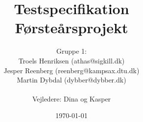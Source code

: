 \documentclass[a4paper,oneside,article]{memoir}
\title{Testspecifikation  \\ \small{Førsteårsprojekt}}
\author
{
  Gruppe 1:\\
  Troels Henriksen (athas@sigkill.dk)\\
  Jesper Reenberg (reenberg@kampsax.dtu.dk)\\
  Martin Dybdal (dybber@dybber.dk)\\ \\
  Vejledere: Dina og Kasper
}
\date{\today}
\begin{document}
\maketitle
\newpage
\tableofcontents*
\newpage

\renewcommand\arraystretch{1.2} %








 
\end{document}
